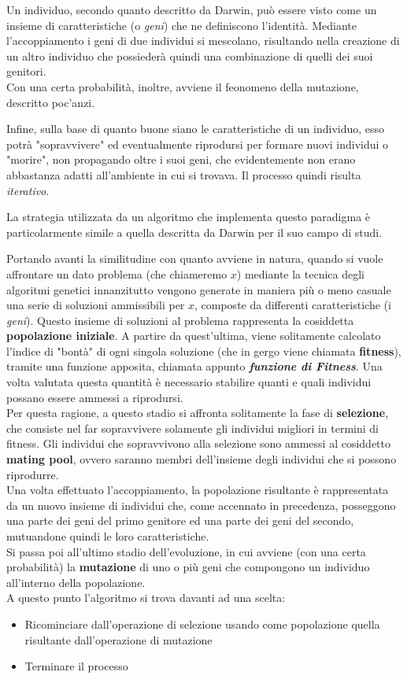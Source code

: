     Un individuo, secondo quanto descritto da Darwin, può essere visto come un insieme di caratteristiche (o \textit{geni}) che ne definiscono l'identità. Mediante l'accoppiamento i geni di due individui si mescolano, risultando nella creazione di un altro individuo che possiederà quindi una combinazione di quelli dei suoi genitori. \\
    Con una certa probabilità, inoltre, avviene il feonomeno della mutazione, descritto poc'anzi.

    Infine, sulla base di quanto buone siano le caratteristiche di un individuo, esso potrà "sopravvivere" ed eventualmente riprodursi per formare nuovi individui o "morire", non propagando oltre i suoi geni, che evidentemente non erano abbastanza adatti all'ambiente in cui si trovava. Il processo quindi risulta \textit{iterativo}.

    La strategia utilizzata da un algoritmo che implementa questo paradigma è particolarmente simile a quella descritta da Darwin per il suo campo di studi.

    Portando avanti la similitudine con quanto avviene in natura, quando si vuole affrontare un dato problema (che chiameremo $x$) mediante la tecnica degli algoritmi genetici innanzitutto vengono generate in maniera più o meno casuale una serie di soluzioni ammissibili per $x$, composte da differenti caratteristiche (i \textit{geni}). Questo insieme di soluzioni al problema rappresenta la cosiddetta \textbf{popolazione iniziale}. A partire da quest'ultima, viene solitamente calcolato l'indice di "bontà" di ogni singola soluzione (che in gergo viene chiamata \textbf{fitness}), tramite una funzione apposita, chiamata appunto \textbf{\textit{funzione di Fitness}}. Una volta valutata questa quantità è necessario stabilire quanti e quali individui possano essere ammessi a riprodursi. \\
    Per questa ragione, a questo stadio si affronta solitamente la fase di \textbf{selezione}, che consiste nel far sopravvivere solamente gli individui migliori in termini di fitness. Gli individui che sopravvivono alla selezione sono ammessi al cosiddetto \textbf{mating pool}, ovvero saranno membri dell'insieme degli individui che si possono riprodurre. \\
    Una volta effettuato l'accoppiamento, la popolazione risultante è rappresentata da un nuovo insieme di individui che, come accennato in precedenza, posseggono una parte dei geni del primo genitore ed una parte dei geni del secondo, mutuandone quindi le loro caratteristiche. \\
    Si passa poi all'ultimo stadio dell'evoluzione, in cui avviene (con una certa probabilità) la \textbf{mutazione} di uno o più geni che compongono un individuo all'interno della popolazione. \\
    A questo punto l'algoritmo si trova davanti ad una scelta: 
    \begin{itemize}
        \item Ricominciare dall'operazione di selezione usando come popolazione quella risultante dall'operazione di mutazione
        \item Terminare il processo
    \end{itemize}

